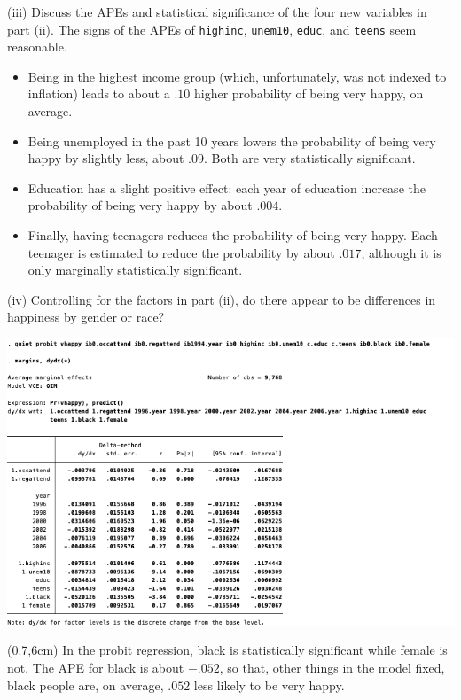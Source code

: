 \documentclass[
  10pt,
  ignorenonframetext,
]{beamer}
\newcommand\MyText[1]{%
  \begin{textblock*}{4.5cm}(0.7\textwidth,6cm)%
    #1
  \end{textblock*}
}
\begin{document}
\begin{frame}[fragile]{(iii) Discuss the APEs and statistical
significance of the four new variables in part (ii).}
\protect\hypertarget{iii-discuss-the-apes-and-statistical-significance-of-the-four-new-variables-in-part-ii.}{}
The signs of the APEs of \texttt{highinc}, \texttt{unem10},
\texttt{educ}, and \texttt{teens} seem reasonable.

\begin{itemize}
\item
  Being in the highest income group (which, unfortunately, was not
  indexed to inflation) leads to about a \(.10\) higher probability of
  being very happy, on average.
\item
  Being unemployed in the past 10 years lowers the probability of being
  very happy by slightly less, about \(.09\). Both are very
  statistically significant.
\item
  Education has a slight positive effect: each year of education
  increase the probability of being very happy by about \(.004\).
\item
  Finally, having teenagers reduces the probability of being very happy.
  Each teenager is estimated to reduce the probability by about
  \(.017\), although it is only marginally statistically significant.
\end{itemize}
\end{frame}

\begin{frame}{(iv) Controlling for the factors in part (ii), do there
appear \quad to be differences in happiness by gender or race?}
\protect\hypertarget{iv-controlling-for-the-factors-in-part-ii-do-there-appear-to-be-differences-in-happiness-by-gender-or-race}{}
\begin{center}\includegraphics[width=0.9\linewidth]{pictures/ex2-PROBIT-APE-add6ctrls} \end{center}

\MyText{\footnotesize In the probit regression, black is statistically significant while female is not. The APE for black is about $-.052$, so that, other things in the model fixed, black people are, on average, $.052$ less likely to be very happy.}
\end{frame}
\end{document}
